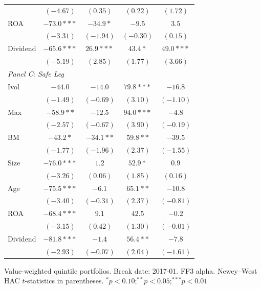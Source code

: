 \begin{table}[htbp]
\begin{tabular}{l c c c c}
 & $(-4.67)$ & $(0.35)$ & $(0.22)$ & $(1.72)$ \\
ROA & $-73.0***$ & $-34.9*$ & $-9.5$ & $3.5$ \\
 & $(-3.31)$ & $(-1.94)$ & $(-0.30)$ & $(0.15)$ \\
Dividend & $-65.6***$ & $26.9***$ & $43.4*$ & $49.0***$ \\
 & $(-5.19)$ & $(2.85)$ & $(1.77)$ & $(3.66)$ \\
\midrule
\multicolumn{5}{l}{\textit{Panel C: Safe Leg}} \\
Ivol & $-44.0$ & $-14.0$ & $79.8***$ & $-16.8$ \\
 & $(-1.49)$ & $(-0.69)$ & $(3.10)$ & $(-1.10)$ \\
Max & $-58.9**$ & $-12.5$ & $94.0***$ & $-4.8$ \\
 & $(-2.57)$ & $(-0.67)$ & $(3.90)$ & $(-0.19)$ \\
BM & $-43.2*$ & $-34.1**$ & $59.8**$ & $-39.5$ \\
 & $(-1.77)$ & $(-1.96)$ & $(2.37)$ & $(-1.55)$ \\
Size & $-76.0***$ & $1.2$ & $52.9*$ & $0.9$ \\
 & $(-3.26)$ & $(0.06)$ & $(1.85)$ & $(0.16)$ \\
Age & $-75.5***$ & $-6.1$ & $65.1**$ & $-10.8$ \\
 & $(-3.40)$ & $(-0.31)$ & $(2.37)$ & $(-0.81)$ \\
ROA & $-68.4***$ & $9.1$ & $42.5$ & $-0.2$ \\
 & $(-3.15)$ & $(0.42)$ & $(1.30)$ & $(-0.01)$ \\
Dividend & $-81.8***$ & $-1.4$ & $56.4**$ & $-7.8$ \\
 & $(-2.93)$ & $(-0.07)$ & $(2.04)$ & $(-1.61)$ \\
\bottomrule
\end{tabular}
\vspace{4pt}
\begin{minipage}{0.9\textwidth}
\footnotesize
Value-weighted quintile portfolios. Break date: 2017-01. FF3 alpha.
Newey--West HAC $t$-statistics in parentheses.
$^{*}p<0.10$;\quad $^{**}p<0.05$;\quad $^{***}p<0.01$
\end{minipage}
\end{table}

